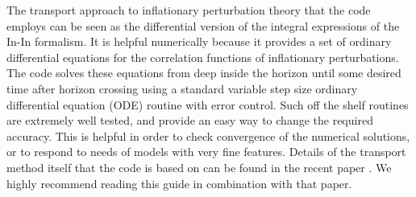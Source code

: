 \documentclass[10pt,
amsmath,amssymb,
aps,prd,nofootinbib,eqsecnum,a4paper]{revtex4}
\begin{document}
The transport approach to inflationary perturbation theory that the code employs 
can be seen as the differential version of the integral expressions of the In-In formalism. It 
is helpful numerically because it provides a set of ordinary differential equations for the correlation functions  
of inflationary perturbations. The code solves these equations from deep inside the horizon until some desired time 
after horizon crossing using a standard variable step size ordinary differential equation (ODE) 
routine with error control. Such off the shelf 
routines are extremely well tested, and provide
an easy way to change the required accuracy. This is helpful in order to check convergence of the numerical 
solutions, or to respond to needs of models with very fine features. 
Details of the transport method itself that the code is based on can be found in the recent paper \cite{xxx,xxx1}. We 
highly recommend reading this guide in combination with that paper.
\nocite{*}

\end{document}
